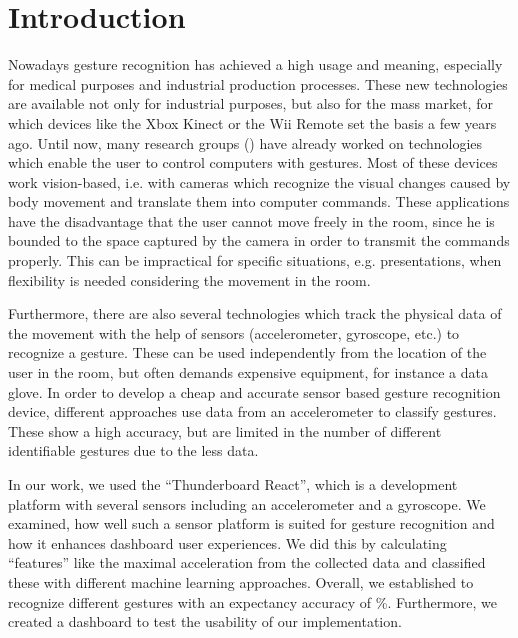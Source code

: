 
\chapter{Introduction}
\label{ch:Introduction}

Nowadays gesture recognition has achieved a high usage and meaning, especially for medical purposes and industrial production processes.
These new technologies are available not only for industrial purposes, but also for the mass market, for which devices like the Xbox Kinect or the Wii Remote set the basis a few years ago.
Until now, many research groups () have already worked on technologies which enable the user to control computers with gestures.
Most of these devices work vision-based, i.e. with cameras which recognize the visual changes caused by body movement and translate them into computer commands.
These applications have the disadvantage that the user cannot move freely in the room, since he is bounded to the space captured by the camera in order to transmit the commands properly.
This can be impractical for specific situations, e.g. presentations, when flexibility is needed considering the movement in the room.

Furthermore, there are also several technologies which track the physical data of the movement with the help of sensors (accelerometer, gyroscope, etc.) to recognize a gesture.
These can be used independently from the location of the user in the room, but often demands expensive equipment, for instance a data glove.
In order to develop a cheap and accurate sensor based gesture recognition device, different approaches use data from an accelerometer to classify gestures.
These show a high accuracy, but are limited in the number of different identifiable gestures due to the less data.

In our work, we used the “Thunderboard React”, which is a development platform with several sensors including an accelerometer and a gyroscope.
We examined, how well such a sensor platform is suited for gesture recognition and how it enhances dashboard user experiences.
We did this by calculating “features” like the maximal acceleration from the collected data and classified these with different machine learning approaches.
Overall, we established to recognize  different gestures with an expectancy accuracy of \%.
Furthermore, we created a dashboard to test the usability of our implementation.